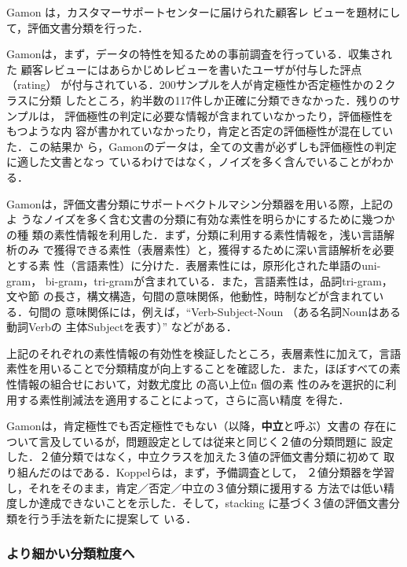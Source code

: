 \vspace{1em}
\underline{\textbf{\cite{gamon2004a}}}
\vspace{1em}

Gamon \cite{gamon2004a}は，カスタマーサポートセンターに届けられた顧客レ
ビューを題材にして，評価文書分類を行った．

Gamonは，まず，データの特性を知るための事前調査を行っている．収集された
顧客レビューにはあらかじめレビューを書いたユーザが付与した評点（rating）
が付与されている．200サンプルを人が肯定極性か否定極性かの２クラスに分類
したところ，約半数の117件しか正確に分類できなかった．残りのサンプルは，
評価極性の判定に必要な情報が含まれていなかったり，評価極性をもつような内
容が書かれていなかったり，肯定と否定の評価極性が混在していた．この結果か
ら，Gamonのデータは，全ての文書が必ずしも評価極性の判定に適した文書となっ
ているわけではなく，ノイズを多く含んでいることがわかる．

Gamonは，評価文書分類にサポートベクトルマシン分類器を用いる際，上記のよ
うなノイズを多く含む文書の分類に有効な素性を明らかにするために幾つかの種
類の素性情報を利用した．まず，分類に利用する素性情報を，浅い言語解析のみ
で獲得できる素性（表層素性）と，獲得するために深い言語解析を必要とする素
性（言語素性）に分けた．表層素性には，原形化された単語のuni-gram，
bi-gram，tri-gramが含まれている．また，言語素性は，品詞tri-gram，文や節
の長さ，構文構造，句間の意味関係，他動性，時制などが含まれている．句間の
意味関係には，例えば，``Verb-Subject-Noun （ある名詞Nounはある動詞Verbの
主体Subjectを表す）'' などがある．

上記のそれぞれの素性情報の有効性を検証したところ，表層素性に加えて，言語
素性を用いることで分類精度が向上することを確認した．また，ほぼすべての素
性情報の組合せにおいて，対数尤度比\cite{dunning1993a} の高い上位n 個の素
性のみを選択的に利用する素性削減法を適用することによって，さらに高い精度
を得た．

\vspace{1em}

Gamonは，肯定極性でも否定極性でもない（以降，\textbf{中立}と呼ぶ）文書の
存在について言及しているが，問題設定としては従来と同じく２値の分類問題に
設定した．２値分類ではなく，中立クラスを加えた３値の評価文書分類に初めて
取り組んだのは\cite{koppel2005a}である．Koppelらは，まず，予備調査として，
２値分類器を学習し，それをそのまま，肯定／否定／中立の３値分類に援用する
方法では低い精度しか達成できないことを示した．そして，stacking
\cite{wolpert1992a}に基づく３値の評価文書分類を行う手法を新たに提案して
いる．

\subsubsection{より細かい分類粒度へ}
\label{sec:dc_gra}

